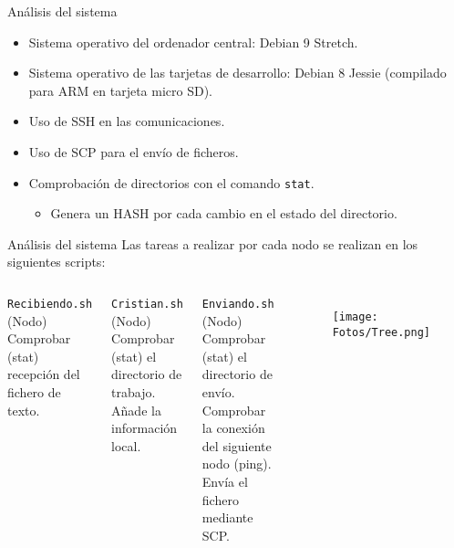 \documentclass[aspectratio=169]{beamer}
\begin{document}
\begin{frame}{Análisis del sistema}
	\begin{itemize}
		\item Sistema operativo del ordenador central: Debian 9 Stretch.
		\item Sistema operativo de las tarjetas de desarrollo: Debian 8 Jessie (compilado para ARM en tarjeta micro SD).
		\item Uso de SSH en las comunicaciones.
		\item Uso de SCP para el envío de ficheros.
		\item Comprobación de directorios con el comando \texttt{stat}. 
		\begin{itemize}
			\item Genera un HASH por cada cambio en el estado del directorio.
		\end{itemize}
	\end{itemize}
\end{frame}

\begin{frame}{Análisis del sistema}
	Las tareas a realizar por cada nodo se realizan en los siguientes scripts:
	

\begin{columns}
		\begin{block}{\texttt{Recibiendo.sh} (Nodo)}
			Comprobar (stat) recepción del fichero de texto.
		\end{block}
		\begin{block}{\texttt{Cristian.sh} (Nodo)}
			Comprobar (stat) el directorio de trabajo.
			Añade la información local.
		\end{block}
		\begin{block}{\texttt{Enviando.sh} (Nodo)}
			Comprobar (stat) el directorio de envío.
			Comprobar la conexión del siguiente nodo (ping).
			Envía el fichero mediante SCP.
		\end{block}
		\begin{figure}[h]
			\centering
			\texttt{[image: Fotos/Tree.png]}
		\end{figure}
\end{columns}
\end{frame}
\end{document}
